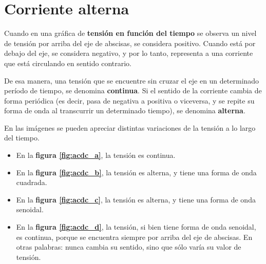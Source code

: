 \chapter{Corriente alterna}

Cuando en una gráfica de \textbf{tensión en función del tiempo} se observa un nivel de tensión por arriba del eje de abscisas, se considera positivo. Cuando está por debajo del eje, se considera negativo, y por lo tanto, representa a una corriente que está circulando en sentido contrario.
 
De esa manera, una tensión que se encuentre sin cruzar el eje en un determinado período de tiempo, se denomina \textbf{continua}. Si el sentido de la corriente cambia de forma periódica (es decir, pasa de negativa a positiva o viceversa, y se repite su forma de onda al transcurrir un determinado tiempo), se denomina \textbf{alterna}.
\begin{ejemplo}
	En las imágenes se pueden apreciar distintas variaciones de la tensión a lo largo del tiempo.
	\begin{itemize}
		\item En la \textbf{figura \ref{fig:acdc_a}}, la tensión es continua.
		\item En la \textbf{figura \ref{fig:acdc_b}}, la tensión es alterna, y tiene una forma de onda cuadrada.
		\item En la \textbf{figura \ref{fig:acdc_c}}, la tensión es alterna, y tiene una forma de onda senoidal.
		\item En la \textbf{figura \ref{fig:acdc_d}}, la tensión, si bien tiene forma de onda senoidal, es continua, porque se encuentra siempre por arriba del eje de abscisas. En otras palabras: nunca cambia su sentido, sino que sólo varía su valor de tensión.
	\end{itemize}
\end{ejemplo}

